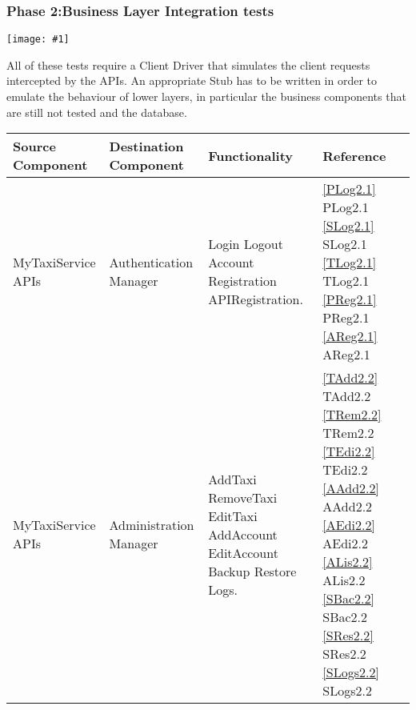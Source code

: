 \documentclass[11pt, a4paper,titlepage]{article}
\newcommand{\image}[1]{
	\begin{center}
		\noindent \texttt{[image: \#1]}
	\end{center}
}
\begin{document}
	\subsubsection{Phase 2:Business Layer Integration tests}
	\image{test_phase2.png}	
	All of these tests require a Client Driver that simulates the client requests intercepted by the APIs. An appropriate Stub has to be written in order to emulate the behaviour of lower layers, in particular the business components that are still not tested and the database.
	\newline
	\newline
	\begin{tabularx}{\textwidth}{| X |X |X |X|}
		\hline \textbf{Source Component} &\textbf{Destination Component}&\textbf{Functionality} & \textbf{Reference} \\
		\hline MyTaxiService APIs & Authentication Manager & 
		Login\newline
		Logout\newline
		Account Registration\newline
		APIRegistration.
		& \ref{PLog2.1} PLog2.1 \newline \ref{SLog2.1} SLog2.1 \newline \ref{TLog2.1} TLog2.1 \newline \ref{PReg2.1} PReg2.1 \newline \ref{AReg2.1} AReg2.1
		\\
		\hline MyTaxiService APIs & Administration Manager &  
		AddTaxi\newline
		RemoveTaxi\newline
		EditTaxi\newline
		AddAccount\newline
		EditAccount\newline
		Backup\newline
		Restore\newline
		Logs.
		&
		\ref{TAdd2.2} TAdd2.2 \newline
		\ref{TRem2.2} TRem2.2 \newline
		\ref{TEdi2.2} TEdi2.2 \newline
		\ref{AAdd2.2} AAdd2.2 \newline
		\ref{AEdi2.2} AEdi2.2 \newline
		\ref{ALis2.2} ALis2.2 \newline
		\ref{SBac2.2} SBac2.2 \newline
		\ref{SRes2.2} SRes2.2 \newline
		\ref{SLogs2.2} SLogs2.2 \newline

\end{tabularx}
\end{document}
